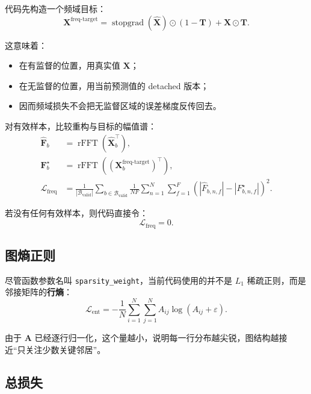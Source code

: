 \documentclass[UTF8]{ctexart}
\begin{document}
代码先构造一个频域目标：
\begin{equation}
    \bm{X}^{\text{freq-target}}
    =
    \operatorname{stopgrad}(\hat{\bm{X}})\odot(1-\bm{T})
    +
    \bm{X}\odot\bm{T}.
\end{equation}

这意味着：
\begin{itemize}
    \item 在有监督的位置，用真实值 $\bm{X}$；
    \item 在无监督的位置，用当前预测值的 detached 版本；
    \item 因而频域损失不会把无监督区域的误差梯度反传回去。
\end{itemize}

对有效样本，比较重构与目标的幅值谱：
\begin{align}
    \hat{\bm{F}}_b &= \operatorname{rFFT}(\hat{\bm{X}}_b^\top), \\
    \bm{F}^{\star}_b &= \operatorname{rFFT}((\bm{X}^{\text{freq-target}}_b)^\top), \\
    \mathcal{L}_{\text{freq}}
    &=
    \frac{1}{|\mathcal{B}_{\text{valid}}|}
    \sum_{b \in \mathcal{B}_{\text{valid}}}
    \frac{1}{NF}
    \sum_{n=1}^{N}\sum_{f=1}^{F}
    \left(
        \left|\hat{F}_{b,n,f}\right|
        -
        \left|F^{\star}_{b,n,f}\right|
    \right)^2.
\end{align}

若没有任何有效样本，则代码直接令：
\begin{equation}
    \mathcal{L}_{\text{freq}} = 0.
\end{equation}

\subsection{图熵正则}

尽管函数参数名叫 \texttt{sparsity\_weight}，当前代码使用的并不是 $L_1$ 稀疏正则，而是邻接矩阵的\textbf{行熵}：
\begin{equation}
    \mathcal{L}_{\text{ent}}
    =
    -\frac{1}{N}\sum_{i=1}^{N}\sum_{j=1}^{N}A_{ij}\log(A_{ij}+\varepsilon).
\end{equation}

由于 $\bm{A}$ 已经逐行归一化，这个量越小，说明每一行分布越尖锐，图结构越接近“只关注少数关键邻居”。

\subsection{总损失}
\end{document}
